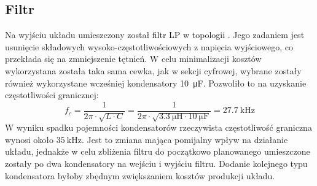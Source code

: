 \documentclass[11pt]{article}
\begin{document}
\subsection{Filtr}
Na wyjściu układu umieszczony został filtr LP w topologii \Pi. Jego zadaniem jest usunięcie składowych wysoko-częstotliwościowych z napięcia wyjściowego, co przekłada się na zmniejszenie tętnień. W celu minimalizacji kosztów wykorzystana została taka sama cewka, jak w sekcji cyfrowej, wybrane zostały również wykorzystane wcześniej kondensatory \SI{10}{\micro\farad}. Pozwoliło to na uzyskanie częstotliwości granicznej: $$f_c = \frac{1}{2\pi \cdot \sqrt{L \cdot C}} = \frac{1}{2\pi \cdot \sqrt{\SI{3.3}{\micro\henry} \cdot \SI{10}{\micro\farad}}} = \SI{27.7}{\kilo\hertz}$$
W wyniku spadku pojemności kondensatorów rzeczywista częstotliwość graniczna wynosi około $\SI{35}{\kilo\hertz}$. Jest to zmiana mająca pomijalny wpływ na działanie układu, jednakże w celu zbliżenia filtru do początkowo planowanego umieszczone zostały po dwa kondensatory na wejściu i wyjściu filtru. Dodanie kolejnego typu kondensatora byłoby zbędnym zwiększaniem kosztów produkcji układu.
\end{document}
